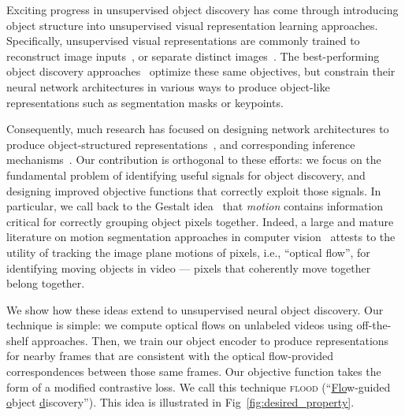 \documentclass{article}
\newcommand{\jd}[1]{\textcolor{orange}{[DJ: #1]}}
\begin{document}
Exciting progress in unsupervised object discovery has come through introducing object structure into unsupervised visual representation learning approaches. Specifically, unsupervised visual representations are commonly trained to reconstruct image inputs~\cite{oord2017neural, dippel2021towards}, or separate distinct images~\cite{chen2020improved,chen2020simple}. The best-performing object discovery approaches~\cite{eslami2016attend,jakab2018unsupervised,jakab2020self,greff2019multi, burgess2019monet,crawford2019spatially,locatello2020object,racah2020slot, lowe2020learning, Kulkarni2019UnsupervisedLO, minderer2019unsupervised, engelcke2019genesis, lin2020space} optimize these same objectives, but constrain their neural network architectures in various ways to produce object-like representations such as segmentation masks or keypoints.  %



Consequently, much research has focused on designing network architectures to produce object-structured representations~\cite{jakab2018unsupervised,jakab2020self,Kulkarni2019UnsupervisedLO,lowe2020learning,locatello2020object,crawford2019spatially}, and corresponding inference mechanisms~\cite{eslami2016attend, greff2019multi, engelcke2019genesis}. Our contribution is orthogonal to these efforts: we focus on the fundamental problem of identifying useful signals for object discovery, and designing improved objective functions that correctly exploit those signals. In particular, we call back to the Gestalt idea~\cite{wertheimer1938laws} that \emph{motion} contains information critical for correctly grouping object pixels together. Indeed, a large and mature literature on motion segmentation approaches in computer vision~\cite{tron2007benchmark,yan2006general,keuper2018motion,bideau2018moa, yang2021rigidmask} attests to the utility of tracking the image plane motions of pixels, i.e., ``optical flow'', for identifying moving objects in video --- pixels that coherently move together belong together.

We show how these ideas extend to unsupervised neural object discovery. Our technique is simple: we compute optical flows on unlabeled videos using off-the-shelf approaches. Then, we train our object encoder to produce representations for nearby frames that are consistent with the optical flow-provided correspondences between those same frames. Our objective function takes the form of a modified contrastive loss. We call this technique \textsc{flood} (``\ul{Flo}w-guided \ul{o}bject \ul{d}iscovery''). This idea is illustrated in Fig~\ref{fig:desired_property}.
\end{document}
